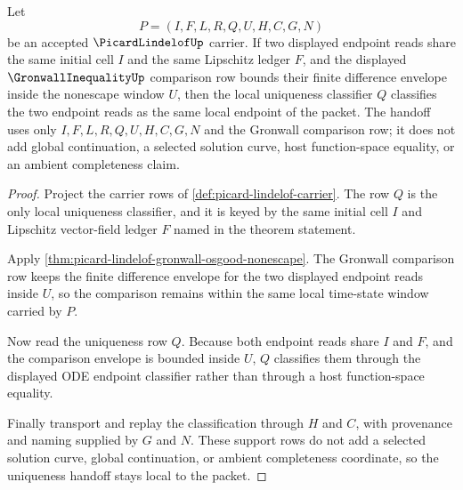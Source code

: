 \begin{theorem}
\label{thm:picard-lindelof-gronwall-uniqueness-handoff}
Let
$$
P=(I,F,L,R,Q,U,H,C,G,N)
$$
be an accepted $\PicardLindelofUp$ carrier. If two displayed endpoint reads share the same initial cell $I$ and the same Lipschitz ledger $F$, and the displayed $\GronwallInequalityUp$ comparison row bounds their finite difference envelope inside the nonescape window $U$, then the local uniqueness classifier $Q$ classifies the two endpoint reads as the same local endpoint of the packet. The handoff uses only $I,F,L,R,Q,U,H,C,G,N$ and the Gronwall comparison row; it does not add global continuation, a selected solution curve, host function-space equality, or an ambient completeness claim.
\end{theorem}
\begin{proof}
Project the carrier rows of \autoref{def:picard-lindelof-carrier}. The row $Q$ is the only local uniqueness classifier, and it is keyed by the same initial cell $I$ and Lipschitz vector-field ledger $F$ named in the theorem statement.

Apply \autoref{thm:picard-lindelof-gronwall-osgood-nonescape}. The Gronwall comparison row keeps the finite difference envelope for the two displayed endpoint reads inside $U$, so the comparison remains within the same local time-state window carried by $P$.

Now read the uniqueness row $Q$. Because both endpoint reads share $I$ and $F$, and the comparison envelope is bounded inside $U$, $Q$ classifies them through the displayed ODE endpoint classifier rather than through a host function-space equality.

Finally transport and replay the classification through $H$ and $C$, with provenance and naming supplied by $G$ and $N$. These support rows do not add a selected solution curve, global continuation, or ambient completeness coordinate, so the uniqueness handoff stays local to the packet.
\end{proof}

